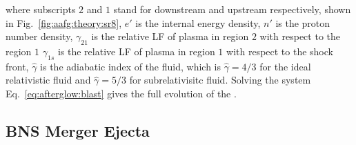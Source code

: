 %
where subscripts $2$ and $1$ stand for downstream and upstream respectively, 
shown in Fig.~\ref{fig:aafg:theory:sr8}, 
$e'$ is the internal energy density, $n'$ is the proton number density, 
$\gamma_{21}$ is the relative \ac{LF} of plasma in region 
$2$ with respect to the region $1$
$\gamma_{1s}$ is the relative \ac{LF} of plasma in region $1$ with respect to the shock front,
$\hat{\gamma}$ is the adiabatic index of the fluid, which is $\hat{\gamma}=4/3$ for the ideal relativistic 
fluid and $\hat{\gamma}=5/3$ for subrelativisitc fluid.
%
Solving the system Eq.~\eqref{eq:afterglow:blast} gives the full evolution 
of the \blast{}. 




























\subsection{\ac{BNS} Merger Ejecta} \label{sec:intro:ejecta}





